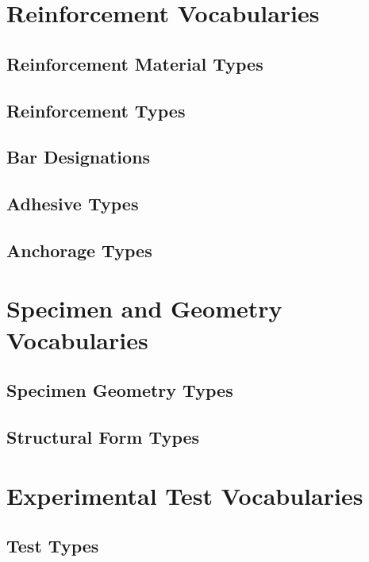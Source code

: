 \section{Reinforcement Vocabularies}

\subsection{Reinforcement Material Types}

\subsection{Reinforcement Types}

\subsection{Bar Designations}

\subsection{Adhesive Types}

\subsection{Anchorage Types}


\section{Specimen and Geometry Vocabularies}

\subsection{Specimen Geometry Types}

\subsection{Structural Form Types}


\section{Experimental Test Vocabularies}

\subsection{Test Types}

